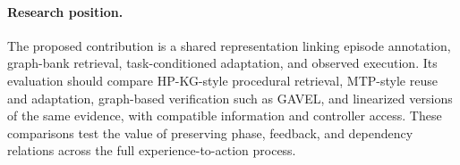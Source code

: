 \paragraph{Research position.}
The proposed contribution is a shared representation linking episode annotation, graph-bank retrieval, task-conditioned adaptation, and observed execution. Its evaluation should compare HP-KG-style procedural retrieval, MTP-style reuse and adaptation, graph-based verification such as GAVEL, and linearized versions of the same evidence, with compatible information and controller access. These comparisons test the value of preserving phase, feedback, and dependency relations across the full experience-to-action process.

